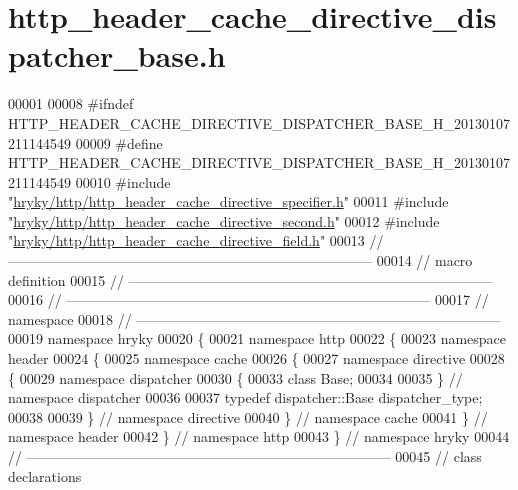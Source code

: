 \hypertarget{http__header__cache__directive__dispatcher__base_8h_source}{\section{http\-\_\-header\-\_\-cache\-\_\-directive\-\_\-dispatcher\-\_\-base.\-h}
}

\begin{DoxyCode}
00001 
00008 \textcolor{preprocessor}{#ifndef HTTP\_HEADER\_CACHE\_DIRECTIVE\_DISPATCHER\_BASE\_H\_20130107211144549}
00009 \textcolor{preprocessor}{}\textcolor{preprocessor}{#define HTTP\_HEADER\_CACHE\_DIRECTIVE\_DISPATCHER\_BASE\_H\_20130107211144549}
00010 \textcolor{preprocessor}{}\textcolor{preprocessor}{#include "\hyperlink{http__header__cache__directive__specifier_8h}{hryky/http/http_header_cache_directive_specifier.h}"}
00011 \textcolor{preprocessor}{#include "\hyperlink{http__header__cache__directive__second_8h}{hryky/http/http_header_cache_directive_second.h}"}
00012 \textcolor{preprocessor}{#include "\hyperlink{http__header__cache__directive__field_8h}{hryky/http/http_header_cache_directive_field.h}"}
00013 \textcolor{comment}{//
      ------------------------------------------------------------------------------}
00014 \textcolor{comment}{// macro definition}
00015 \textcolor{comment}{//
      ------------------------------------------------------------------------------}
00016 \textcolor{comment}{//
      ------------------------------------------------------------------------------}
00017 \textcolor{comment}{// namespace}
00018 \textcolor{comment}{//
      ------------------------------------------------------------------------------}
00019 \textcolor{keyword}{namespace }hryky
00020 \{
00021 \textcolor{keyword}{namespace }http
00022 \{
00023 \textcolor{keyword}{namespace }header
00024 \{
00025 \textcolor{keyword}{namespace }cache
00026 \{
00027 \textcolor{keyword}{namespace }directive
00028 \{
00029 \textcolor{keyword}{namespace }dispatcher
00030 \{
00033     \textcolor{keyword}{class }Base;
00034 
00035 \} \textcolor{comment}{// namespace dispatcher}
00036 
00037 \textcolor{keyword}{typedef} dispatcher::Base dispatcher\_type;
00038 
00039 \} \textcolor{comment}{// namespace directive}
00040 \} \textcolor{comment}{// namespace cache}
00041 \} \textcolor{comment}{// namespace header}
00042 \} \textcolor{comment}{// namespace http}
00043 \} \textcolor{comment}{// namespace hryky}
00044 \textcolor{comment}{//
      ------------------------------------------------------------------------------}
00045 \textcolor{comment}{// class declarations}

\end{DoxyCode}
